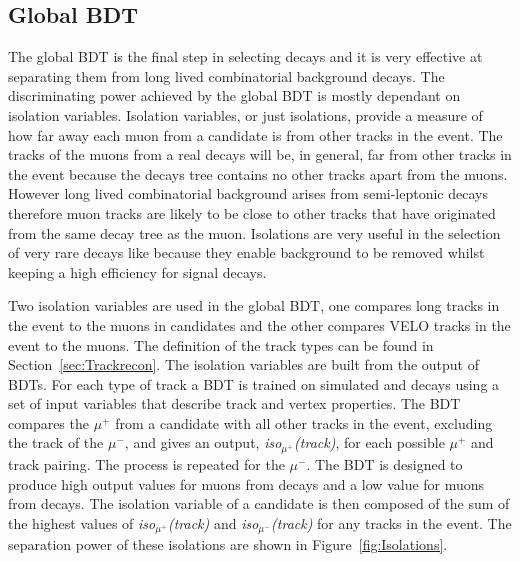 \subsection{Global BDT}
\label{sec:globalBDT}

The global BDT is the final step in selecting \bsmumu decays and it is very effective at separating them from long lived combinatorial background decays. The discriminating power achieved by the global BDT is mostly dependant on isolation variables. Isolation variables, or just isolations, provide a measure of how far away each muon from a \bsmumu candidate is from other tracks in the event. The tracks of the muons from a real \bsmumu decays will be, in general, far from other tracks in the event because the \bsmumu decays tree contains no other tracks apart from the muons. However long lived combinatorial background arises from semi-leptonic decays therefore muon tracks are likely to be close to other tracks that have originated from the same decay tree as the muon. %
Isolations are very useful in the selection of very rare decays like \bsmumu because they enable background to be removed whilst keeping a high efficiency for signal decays.

Two isolation variables are used in the global BDT, one compares long tracks in the event to the muons in \bsmumu candidates and the other compares VELO tracks in the event to the muons. The definition of the track types can be found in Section~\ref{sec:Trackrecon}. The isolation variables are built from the output of BDTs. For each type of track a BDT is trained on simulated \bsmumu and \bbbarmumux decays using a set of input variables that describe track and vertex properties. The BDT compares the $\mu^{+}$ from a \bsmumu candidate with all other tracks in the event, excluding the track of the $\mu^{-}$, and gives an output, {\it iso$_{\mu^{+}}$(track)}, for each possible $\mu^{+}$ and track pairing. The process is repeated for the $\mu^{-}$. The BDT is designed to produce high output values for muons from \bbbarmumux decays and a low value for muons from \bsmumu decays. The isolation variable of a \bsmumu candidate is then composed of the sum of the highest values of {\it iso$_{\mu^{+}}$(track)} and {\it iso$_{\mu^{-}}$(track)} for any tracks in the event. The separation power of these isolations are shown in Figure~\ref{fig:Isolations}. %


